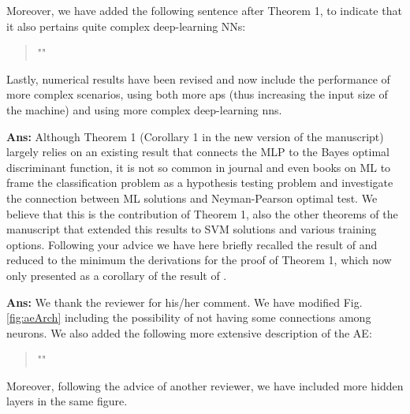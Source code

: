 \documentclass[draftcls,onecolumn,12pt]{IEEEtran}
\newcounter{revc}
\newcommand{\revp}[1]{\zref[revcontent]{#1}}
\begin{document}
Moreover, we have added the following sentence after Theorem 1, to indicate that it also pertains quite complex deep-learning NNs:
\begin{quote}
    "\revp{rev11b}"
\end{quote}
 
Lastly, numerical results have been revised and now include the performance of more complex scenarios, using both more \acp{ap} (thus increasing the input size of the machine) and using more complex deep-learning \acp{nn}. 

\vspace{5mm} %
\begin{framed}
\end{framed}

{\bf Ans:} Although Theorem 1 (Corollary 1 in the new version of the manuscript) largely relies on an existing result that connects the MLP to the Bayes optimal discriminant function, it is not so common in journal and even books on ML to frame the classification problem as a hypothesis testing problem and investigate the connection between ML solutions and Neyman-Pearson optimal test. We believe that this is the contribution of Theorem 1, also the other theorems of the manuscript that extended this results to SVM solutions and various training options. Following your advice we have here briefly recalled the result of \cite{Ruck-90} and reduced to the minimum the derivations for the proof of Theorem 1, which now only presented as a corollary of the result of \cite{Ruck-90}.

\vspace{5mm} %
\begin{framed}
\end{framed}

{\bf Ans:}  We thank the reviewer for his/her comment. We have modified Fig. \ref{fig:aeArch} including the possibility of not having some connections among neurons. We also added the following more extensive description of the AE:
\begin{quote}
    "\revp{deep ae}"
\end{quote}
Moreover, following the advice of another reviewer, we have included more hidden layers in the same figure.
\end{document}

